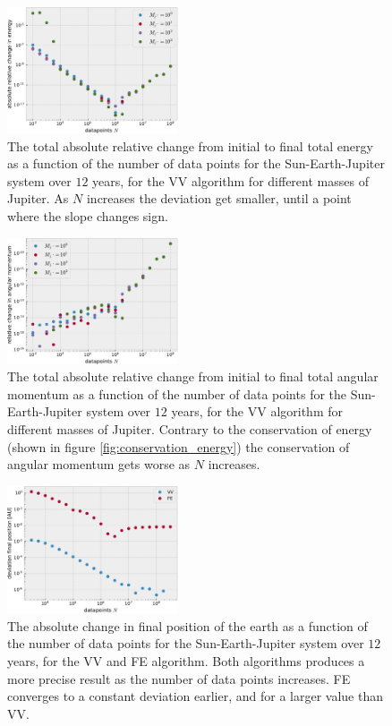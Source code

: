 \documentclass[%
 reprint,
nofootinbib,
aps,
]{revtex4-1}
\begin{document}
\begin{figure}
  \centering
  \includegraphics[width=0.45\textwidth]{../figures/conservation_energy2.pdf}
  \caption{The total absolute relative change from initial to final total energy as a function of the number of data points for the Sun-Earth-Jupiter system over $12$ years, for the VV algorithm for different masses of Jupiter. As $N$ increases the deviation get smaller, until a point where the slope changes sign.}
  \label{fig:conservation_energy}
\end{figure}

\begin{figure}
  \centering
  \includegraphics[width=0.45\textwidth]{../figures/conservation_ang_mom_2.pdf}
  \caption{The total absolute relative change from initial to final total angular momentum as a function of the number of data points for the Sun-Earth-Jupiter system over $12$ years, for the VV algorithm for different masses of Jupiter. Contrary to the conservation of energy (shown in figure \vref{fig:conservation_energy}) the conservation of angular momentum gets worse as $N$ increases.}
  \label{fig:change_ang_mom}
\end{figure}

\begin{figure}
  \centering
  \includegraphics[width=0.45\textwidth]{../figures/change_position.pdf}
  \caption{The absolute change in final position of the earth as a function of the number of data points for the Sun-Earth-Jupiter system over $12$ years, for the VV and FE algorithm. Both algorithms produces a more precise result as the number of data points increases. FE converges to a constant deviation earlier, and for a larger value than VV.}
  \label{fig:change_position}
\end{figure}
\end{document}
